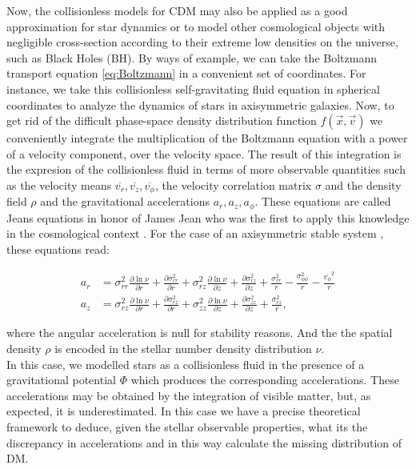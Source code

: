 Now, the collisionless models for CDM may also be applied as a good approximation for star dynamics or to model other cosmological objects with negligible cross-section according to their extreme low densities on the universe, such as Black Holes (BH). By ways of example, we can take the Boltzmann transport equation \eqref{eq:Boltzmann} in a convenient set of coordinates. For instance, we take this collisionless self-gravitating fluid equation in spherical coordinates to analyze the dynamics of stars in axisymmetric galaxies. Now, to get rid of the difficult phase-space density distribution function $f(\vec{x},\vec{v})$ we conveniently integrate the multiplication of the Boltzmann equation with a power of a velocity component, over the velocity space. The result of this integration is the expresion of the collisionless fluid in terms of more observable quantities such as the velocity means $\overline{v_r},\overline{v_z},\overline{v_\phi}$, the velocity correlation matrix $\sigma$ and the density field $\rho$ and the gravitational accelerations $a_r,a_z,a_\phi$. These equations are called Jeans equations in honor of James Jean who was the first to apply this knowledge in the cosmological context \cite{Jeans 1915}. For the case of an axisymmetric stable system \cite{Loebman et al. 2012}, these equations read:  

\begin{align}
a_r & = \sigma^2_{rr} \frac{\partial \ln \nu}{\partial r} + \frac{\partial \sigma^2_{rr} }{\partial r} + \sigma^2_{rz} \frac{\partial \ln \nu}{\partial z} + \frac{\partial \sigma^2_{rz} }{\partial z} +  \frac{\sigma^2_{rr}}{r}-\frac{\sigma^2_{\phi\phi}}{r}-\frac{\overline{v_\phi}^2}{r}\\
a_z & =  \sigma^2_{rz} \frac{\partial \ln \nu}{\partial r} + \frac{\partial \sigma^2_{rz} }{\partial r} + \sigma^2_{zz}\frac{\partial \ln \nu}{\partial z} + \frac{\partial \sigma^2_{zz} }{\partial z} +  \frac{\sigma^2_{rz}}{r},
\end{align}

where the angular acceleration is null for stability reasons. And the the spatial density $\rho$ is encoded in the stellar number density distribution $\nu$.\\

In this case, we modelled stars as a collisionless fluid in the presence of a gravitational potential $\Phi$ which produces the corresponding accelerations. These accelerations may be obtained by the integration of visible matter, but, as expected, it is underestimated. In this case we have a precise theoretical framework to deduce, given the stellar observable properties, what its the discrepancy in accelerations and in this way calculate the missing distribution of DM.\\



